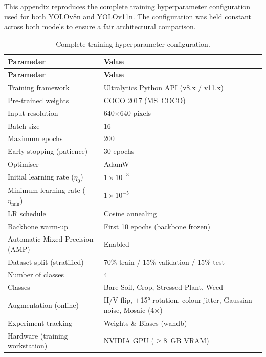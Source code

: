 \documentclass[12pt,a4paper]{report}
\renewcommand{\arraystretch}{1.3}
\begin{document}
This appendix reproduces the complete training hyperparameter configuration used for both YOLOv8n and YOLOv11n. The configuration was held constant across both models to ensure a fair architectural comparison.

\begingroup
\small
\setlength{\parskip}{0pt}
\setlength{\tabcolsep}{4pt}
\renewcommand{\arraystretch}{1.25}
\begin{longtable}{|P{0.38\textwidth}|P{0.52\textwidth}|}
\caption{Complete training hyperparameter configuration.} \label{tab:training_appendix}\\
\hline
{}
\textbf{Parameter} & \textbf{Value} \\ \hline
\endfirsthead
\hline
{}
\textbf{Parameter} & \textbf{Value} \\ \hline
\endhead
Training framework & Ultralytics Python API (v8.x / v11.x) \\ \hline
Pre-trained weights & COCO 2017 (MS~COCO) \\ \hline
Input resolution & 640$\times$640 pixels \\ \hline
Batch size & 16 \\ \hline
Maximum epochs & 200 \\ \hline
Early stopping (patience) & 30 epochs \\ \hline
Optimiser & AdamW \\ \hline
Initial learning rate ($\eta_0$) & $1 \times 10^{-3}$ \\ \hline
Minimum learning rate ($\eta_{\min}$) & $1 \times 10^{-5}$ \\ \hline
LR schedule & Cosine annealing \\ \hline
Backbone warm-up & First 10 epochs (backbone frozen) \\ \hline
Automatic Mixed Precision (AMP) & Enabled \\ \hline
Dataset split (stratified) & 70\% train / 15\% validation / 15\% test \\ \hline
Number of classes & 4 \\ \hline
Classes & Bare Soil, Crop, Stressed Plant, Weed \\ \hline
Augmentation (online) & H/V flip, $\pm$15° rotation, colour jitter, Gaussian noise, Mosaic (4$\times$) \\ \hline
Experiment tracking & Weights \& Biases (wandb) \\ \hline
Hardware (training workstation) & NVIDIA GPU ($\ge$8~GB VRAM) \\ \hline
\end{longtable}
\endgroup
\end{document}
